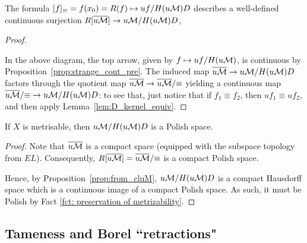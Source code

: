	
	\begin{prop}
		\label{prop:from_cluM}
		The formula $[f]_\equiv=f(x_0)=R(f)\mapsto uf/H(u{\mathcal M})D$ describes a well-defined continuous surjection $R[\overline{u{\mathcal M}}]\to u{\mathcal M}/H(u{\mathcal M})D$,
	\end{prop}
	\begin{proof}$\,$
		\begin{center}
		\end{center}
		
		In the above diagram, the top arrow, given by $f\mapsto uf/H(u{\mathcal M})$, is continuous by Proposition~\ref{prop:strange_cont_pre}. The induced map $\overline{u{\mathcal M}}\to u{\mathcal M}/H(u{\mathcal M})D$ factors through the quotient map $\overline{u{\mathcal M}} \to \overline{u{\mathcal M}}/{\equiv}$ yielding a continuous map $\overline{u{\mathcal M}}/{\equiv}\to u{\mathcal M}/H(u{\mathcal M})D$: to see that, just notice that if $f_1\equiv f_2$, then $uf_1\equiv uf_2$, and then apply Lemma~\ref{lem:D_kernel_equiv}.
	\end{proof}
	
	
	\begin{cor}
		\label{cor:uM/HuMD_Polish}
		If $X$ is metrisable, then $u{\mathcal M}/H(u{\mathcal M})D$ is a Polish space.
	\end{cor}
	\begin{proof}
		Note that $\overline{u{\mathcal M}}$ is a compact space (equipped with the subspace topology from $EL$). Consequently, $R[\overline{u{\mathcal M}}]=\overline{u{\mathcal M}}/{\equiv}$ is a compact Polish space.
		
		Hence, by Proposition~\ref{prop:from_cluM}, $u{\mathcal M}/H(u{\mathcal M})D$ is a compact Hausdorff space which is a continuous image of a compact Polish space. As such, it must be Polish by Fact \ref{fct: preservation of metrizability}.
	\end{proof}
	
	
	
	
	
	
	
	\subsection*{Tameness and Borel ``retractions"}
	
